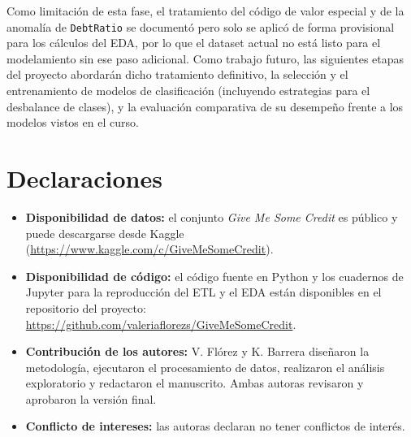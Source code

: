 \documentclass[pdflatex,sn-mathphys-num]{sn-jnl}
\begin{document}
Como limitación de esta fase, el tratamiento del código de valor especial y de la anomalía de \texttt{DebtRatio} se documentó pero solo se aplicó de forma provisional para los cálculos del EDA, por lo que el dataset actual no está listo para el modelamiento sin ese paso adicional. Como trabajo futuro, las siguientes etapas del proyecto abordarán dicho tratamiento definitivo, la selección y el entrenamiento de modelos de clasificación (incluyendo estrategias para el desbalance de clases), y la evaluación comparativa de su desempeño frente a los modelos vistos en el curso.

\backmatter

\section*{Declaraciones}

\begin{itemize}
\item \textbf{Disponibilidad de datos:} el conjunto \textit{Give Me Some Credit} es público y puede descargarse desde Kaggle (\url{https://www.kaggle.com/c/GiveMeSomeCredit}).
\item \textbf{Disponibilidad de código:} el código fuente en Python y los cuadernos de Jupyter para la reproducción del ETL y el EDA están disponibles en el repositorio del proyecto: \url{https://github.com/valeriaflorezs/GiveMeSomeCredit}.
\item \textbf{Contribución de los autores:} V. Flórez y K. Barrera diseñaron la metodología, ejecutaron el procesamiento de datos, realizaron el análisis exploratorio y redactaron el manuscrito. Ambas autoras revisaron y aprobaron la versión final.
\item \textbf{Conflicto de intereses:} las autoras declaran no tener conflictos de interés.
\end{itemize}


\end{document}
